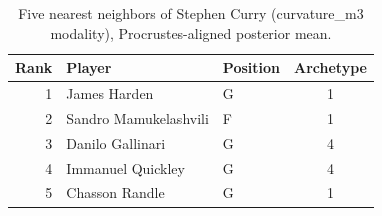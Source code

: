 \begin{table}[htbp]
  \centering\small
  \begin{tabular}{rllc}
    \toprule
    Rank & Player & Position & Archetype \\
    \midrule
    1 & James Harden & G & 1 \\
    2 & Sandro Mamukelashvili & F & 1 \\
    3 & Danilo Gallinari & G & 4 \\
    4 & Immanuel Quickley & G & 4 \\
    5 & Chasson Randle & G & 1 \\
    \bottomrule
  \end{tabular}
  \caption{Five nearest neighbors of Stephen Curry (curvature_m3 modality), Procrustes-aligned posterior mean.}
  \label{tab:Stephen_Curry_neighbors_curvature_m3}
\end{table}

